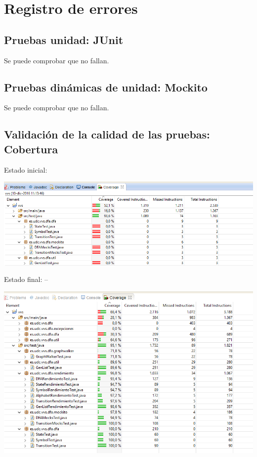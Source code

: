 \documentclass[DIV=calc,paper=a4,fontsize=11pt,onecolumn]{scrartcl} %
\begin{document}
	
	\section{Registro de errores}
	\subsection{Pruebas unidad: JUnit}
	Se puede comprobar que no fallan.
	
	\subsection{Pruebas dinámicas de unidad: Mockito}
	Se puede comprobar que no fallan.
	
	\subsection{Validación de la calidad de las pruebas: Cobertura}
	
	Estado inicial:
	
	
		\includegraphics[width=15cm]{Imagenes/sinCobertura.png}
	
	
	Estado final:
	--
	
		\includegraphics[width=15cm]{Imagenes/Cobertura.png}
	
\end{document}
